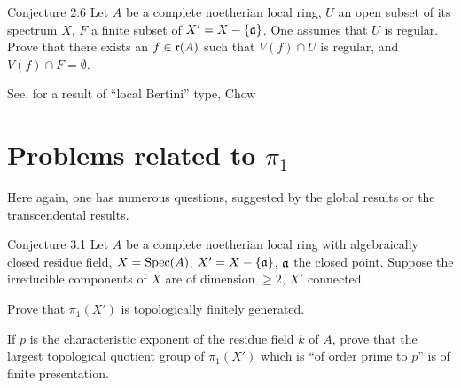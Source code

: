 \label{XIII.2.6}
\begin{enonce*}{Conjecture 2.6\ndemark}
Let $A$ be a complete noetherian local ring, $U$ an open subset of its spectrum $X$, $F$ a finite subset of $X'=X-\{ \mathfrak{a}\}$. One assumes that $U$ is regular. Prove that there exists an $f \in\mathfrak{r}(A)$ such that $V(f)\cap U$ is regular, and $V(f)\cap F=\emptyset$.
\end{enonce*}

See, for a result of ``local Bertini'' type, Chow~\cite{XIII.2}

\section{Problems related to $\pi_1$} \label{XIII.3}

Here again, one has numerous questions, suggested by the global results or the transcendental results.

\label{XIII.3.1}
\begin{enonce*}{Conjecture 3.1\ndemark} Let $A$ be a complete noetherian local ring with algebraically closed residue field, $X=\operatorname{Spec} (A)$, $ X'= X- \{\mathfrak{a}\}$, $\mathfrak{a}$ the closed point. Suppose the irreducible components of $X$ are of dimension $\ge 2$, $X'$ connected.
\begin{enumeratei}
\item
Prove that $\pi_1(X')$ is topologically finitely generated.
\item
If $p$ is the characteristic exponent of the residue field $k$ of $A$, prove that the largest topological quotient group of $\pi_1(X')$ which is ``of order prime to $p$'' is of finite presentation.
\end{enumeratei}
\end{enonce*}

